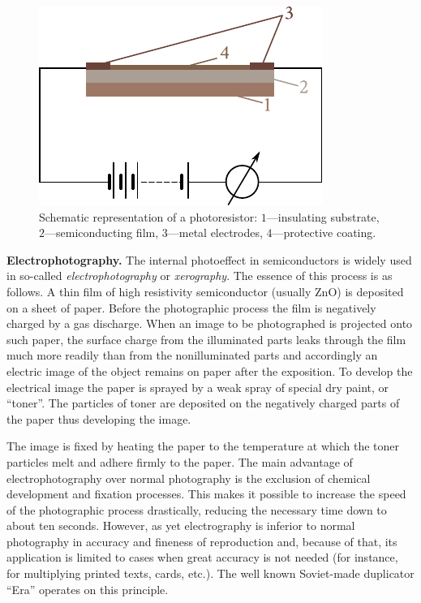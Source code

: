 \begin{figure}[t]
	\begin{center}
		\includegraphics[scale=1]{figures/ch_06/fig_6_21.pdf}
		\caption[]{Schematic representation of a photoresistor: $1$---insulating substrate, $2$---semiconducting film, $3$---metal electrodes, $4$---protective coating.}
		\label{fig:6_21}
	\end{center}
	\vspace{-0.7cm}
\end{figure}

\textbf{Electrophotography.} The internal photoeffect in semiconductors is widely used in so-called \textit{electrophotography} or \textit{xerography}. The essence of this process is as follows. A thin film of high resistivity semiconductor (usually ZnO) is deposited on a sheet of paper. Before the photographic process the film is negatively charged by a gas discharge. When an image to be photographed is projected onto such paper, the surface charge from the illuminated parts leaks through the film much more readily than from the nonilluminated parts and accordingly an electric image of the object remains on paper after the exposition. To develop the electrical image the paper is sprayed by a weak spray of special dry paint, or ``toner''. The particles of toner are deposited on the negatively charged parts of the paper thus developing the image.

The image is fixed by heating the paper to the temperature at which the toner particles melt and adhere firmly to the paper. The main advantage of electrophotography over normal photography is the exclusion of chemical development and fixation processes. This makes it possible to increase the speed of the photographic process drastically, reducing the necessary time down to about ten seconds. However, as yet electrography is inferior to normal photography in accuracy and fineness of reproduction and, because of that, its application is limited to cases when great accuracy is not needed (for instance, for multiplying printed texts, cards, etc.). The well known Soviet-made duplicator ``Era'' operates on this principle.

